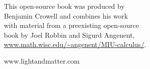 \thispagestyle{empty}

\vspace{100mm}

{\sffamily


\vspace{10mm}

\noindent 
  This open-source book was produced by \\
  Benjamin Crowell and
  combines his work \\
  with material from a
  preexisting open-source\\
  book by Joel Robbin 
  and Sigurd Angenent,\\
  \url{www.math.wisc.edu/~angenent/MIU-calculus/}.

\vspace{10mm}

\noindent www.lightandmatter.com

}
